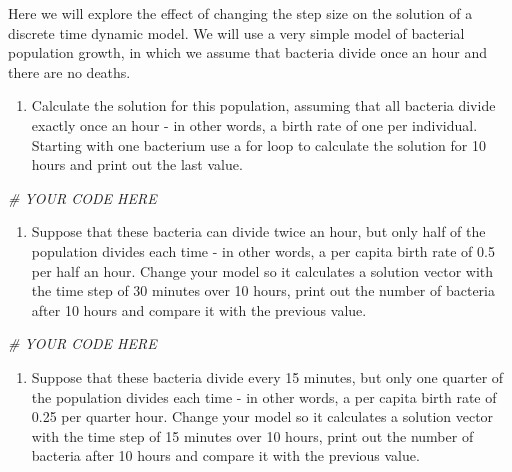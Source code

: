 \documentclass[
]{book}
\newenvironment{Shaded}{\begin{snugshade}}{\end{snugshade}}
\newcommand{\CommentTok}[1]{\textcolor[rgb]{0.56,0.35,0.01}{\textit{#1}}}
\providecommand{\tightlist}{%
  \setlength{\itemsep}{0pt}\setlength{\parskip}{0pt}}
\theoremstyle{definition}
\theoremstyle{definition}
\theoremstyle{definition}
\theoremstyle{remark}
\begin{document}
Here we will explore the effect of changing the step size on the solution of a discrete time dynamic model. We will use a very simple model of bacterial population growth, in which we assume that bacteria divide once an hour and there are no deaths.

\begin{enumerate}
\def\labelenumi{\arabic{enumi}.}
\tightlist
\item
  Calculate the solution for this population, assuming that all bacteria divide exactly once an hour - in other words, a birth rate of one per individual. Starting with one bacterium use a for loop to calculate the solution for 10 hours and print out the last value.
\end{enumerate}

\begin{Shaded}
\begin{Highlighting}[]
\CommentTok{\# YOUR CODE HERE}
\end{Highlighting}
\end{Shaded}

\begin{enumerate}
\def\labelenumi{\arabic{enumi}.}
\setcounter{enumi}{1}
\tightlist
\item
  Suppose that these bacteria can divide twice an hour, but only half of the population divides each time - in other words, a per capita birth rate of 0.5 per half an hour. Change your model so it calculates a solution vector with the time step of 30 minutes over 10 hours, print out the number of bacteria after 10 hours and compare it with the previous value.
\end{enumerate}

\begin{Shaded}
\begin{Highlighting}[]
\CommentTok{\# YOUR CODE HERE}
\end{Highlighting}
\end{Shaded}

\begin{enumerate}
\def\labelenumi{\arabic{enumi}.}
\setcounter{enumi}{2}
\tightlist
\item
  Suppose that these bacteria divide every 15 minutes, but only one quarter of the population divides each time - in other words, a per capita birth rate of 0.25 per quarter hour. Change your model so it calculates a solution vector with the time step of 15 minutes over 10 hours, print out the number of bacteria after 10 hours and compare it with the previous value.
\end{enumerate}
\end{document}

